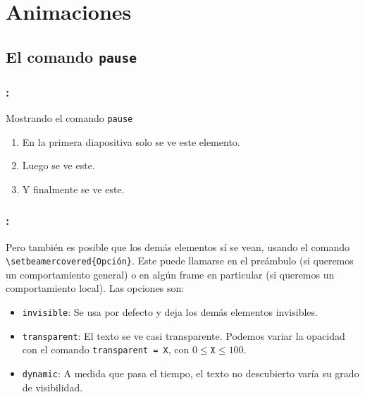 \documentclass[11pt]{beamer}	%
\begin{document}
\section{Animaciones}
\subsection{El comando \texttt{pause}}
\begin{frame}
	\frametitle{\secname : \subsecname}
	
	\begin{block}{Mostrando el comando \texttt{pause}}
	\begin{enumerate}
		\item En la primera diapositiva solo se ve este elemento.	\pause
		\item Luego se ve este.							\pause
		\item Y finalmente se ve este.						
	\end{enumerate}
	\end{block}
\end{frame}

\begin{frame}
	\frametitle{\secname: \subsecname}
		
	Pero también es posible que los demás elementos \alert{sí} se vean, usando el comando \texttt{\textbackslash setbeamercovered\{Opción\}}. Este puede llamarse en el preámbulo (si queremos un comportamiento general) o en algún frame en particular (si queremos un comportamiento local). Las opciones son:
		\begin{itemize}
			\item \texttt{invisible}: Se usa por defecto y deja los demás elementos invisibles.\smallskip
			\item \texttt{transparent}: El texto se ve casi transparente. Podemos variar la opacidad con el comando \texttt{transparent = X}, con $0 \leq \texttt{X} \leq 100$.\smallskip
			\item \texttt{dynamic}: A medida que pasa el tiempo, el texto no descubierto varía su grado de visibilidad.		
		\end{itemize}
		
\end{frame}
\end{document}
